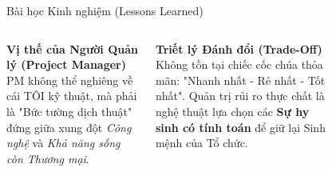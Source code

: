 \documentclass[10pt, aspectratio=169]{beamer}
\begin{document}
\begin{frame}{Bài học Kinh nghiệm (Lessons Learned)}
    \begin{columns}[c]
        \textbf{Vị thế của Người Quản lý (Project Manager)} \\
        PM không thể nghiêng về cái TÔI kỹ thuật, mà phải là "Bức tường dịch thuật" đứng giữa xung đột \textit{Công nghệ} và \textit{Khả năng sống còn Thương mại}.
        
        \vspace{0.3cm}
        \textbf{Triết lý Đánh đổi (Trade-Off)} \\
        Không tồn tại chiếc cốc chúa thỏa mãn:  "Nhanh nhất - Rẻ nhất - Tốt nhất". Quản trị rủi ro thực chất là nghệ thuật lựa chọn các \textbf{Sự hy sinh có tính toán} để giữ lại Sinh mệnh của Tổ chức.
        
        \begin{figure}[H]
            \centering
        \end{figure}
    \end{columns}
\end{frame}
\end{document}
